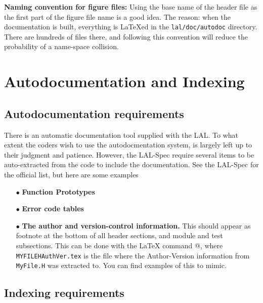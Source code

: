 \documentclass[oneside]{book}
\begin{document}
{\bf Naming convention for figure files:} Using the base name of the
header file as the first part of the figure file name is a good idea.
The reason: when the documentation is built, everything is {\LaTeX}ed
in  the {\tt lal/doc/autodoc} directory. There are hundreds of files there,
and  following this convention will reduce the probability of a
name-space collision.

\section{Autodocumentation and Indexing }

\subsection{Autodocumentation requirements}
There is an automatic documentation tool supplied with the LAL.  To
what extent the coders wish to use the autodocmentation system, is
largely left up to their judgment and patience. However, the
LAL-Spec require several items to be auto-extracted from the code
to include the documentation. See the LAL-Spec for the official
list, but here are some examples

\begin{itemize}
  \item[$\bullet$] {\bf Function Prototypes}
  \item[$\bullet$] {\bf Error code tables }
  \item[$\bullet$] {\bf The author and version-control information.}  This
                        should appear as footnote at the bottom of all
                        header sections, and module and test subsections.
                        This can be done with the {\LaTeX} command
                        \verb@\vfill{\footnotesize}@,
                        where {\tt MYFILEHAuthVer.tex} is the file where
                        the Author-Version information from {\tt MyFile.H}
                        was extracted to.  You can find examples of
                        this to mimic.
\end{itemize}

\subsection{Indexing requirements}
\end{document}
